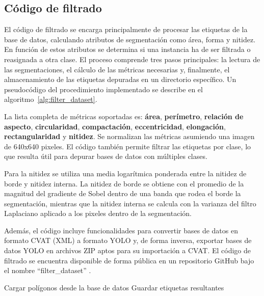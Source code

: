 \subsection{Código de filtrado}
El código de filtrado se encarga principalmente de procesar las etiquetas de la base de datos, calculando atributos de segmentación como área, forma y nitidez. En función de estos atributos se determina si una instancia ha de ser filtrada o reasignada a otra clase. El proceso comprende tres pasos principales: la lectura de las segmentaciones, el cálculo de las métricas necesarias y, finalmente, el almacenamiento de las etiquetas depuradas en un directorio específico. Un pseudocódigo del procedimiento implementado se describe en el algoritmo~\ref{alg:filter_dataset}.

La lista completa de métricas soportadas es: \textbf{área}, \textbf{perímetro}, \textbf{relación de aspecto}, \textbf{circularidad}, \textbf{compactación}, \textbf{eccentricidad}, \textbf{elongación}, \textbf{rectangularidad} y \textbf{nitidez}. Se normalizan las métricas asumiendo una imagen de 640x640 pixeles. El código también permite filtrar las etiquetas por clase, lo que resulta útil para depurar bases de datos con múltiples clases.

Para la nitidez se utiliza una media logarítmica ponderada entre la nitidez de borde y nitidez interna. La nitidez de borde se obtiene con el promedio de la magnitud del gradiente de Sobel dentro de una banda que rodea el borde la segmentación, mientras que la nitidez interna se calcula con la varianza del filtro Laplaciano aplicado a los pixeles dentro de la segmentación.

Además, el código incluye funcionalidades para convertir bases de datos en formato CVAT (XML) a formato YOLO y, de forma inversa, exportar bases de datos YOLO en archivos ZIP aptos para su importación a CVAT. El código de filtrado se encuentra disponible de forma pública en un repositorio GitHub bajo el nombre \enquote{filter\_dataset} \cite{Lopez2025-Filter}.

\begin{algorithm}[H]
  \DontPrintSemicolon
  \SetAlgoLined
  Cargar polígonos desde la base de datos\;
  Guardar etiquetas resultantes\;
  \caption[Algoritmo para filtrado de base de datos]{Algoritmo para filtrado de base de datos.}
  \label{alg:filter_dataset}
\end{algorithm}

